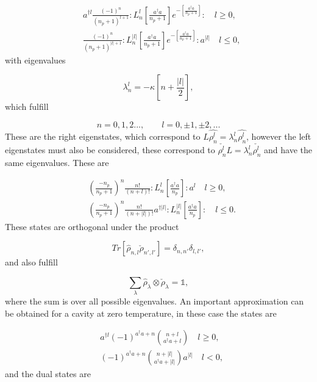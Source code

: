 \documentclass[reprint, amsmath,amssymb, aps,pra]{revtex4-1}
\begin{document}
\begin{align}\label{DefDB}
&a^{\dagger l}\frac{(-1)^n}{(n_p+1)^{l+1}}:L_n^l[\frac{a^\dagger a}{n_p+1}]e^{-[\frac{a^\dagger a}{n_p+1}]}:\quad l \geq 0, \\
&\frac{(-1)^n}{(n_p+1)^{|l|+1}}:L_n^{|l|}[\frac{a^\dagger a}{n_p+1}]e^{-[\frac{a^\dagger a}{n_p+1}]}:a^{|l|}\quad l \leq 0,
\end{align} with eigenvalues

\begin{equation}
\lambda_n^l = -\kappa[n + \frac{|l|}{2}],
\end{equation} which fulfill

\begin{equation}
n=0,1,2...,\qquad l = 0,\pm 1, \pm 2,... 
\end{equation} These are the right eigenstates, which correspond to $L\hat{\rho_n^l} = \lambda_n^l\hat{\rho_n^l}$, however the left eigenstates must also be considered, these correspond to $\check{\rho_n^l}L = \lambda_n^l\check{\rho_n^l}$ and have the same eigenvalues. These are

\begin{align}\label{DefDBDual}
&(\frac{-n_p}{n_p+1})^n\frac{n!}{(n+l)!}:L_n^l[\frac{a^\dagger a}{n_p}]:a^{l}\quad l \geq 0, \\
&(\frac{-n_p}{n_p+1})^n\frac{n!}{(n+|l|)!}a^{\dagger|l|}:L_n^{|l|}[\frac{a^\dagger a}{n_p}]:\quad l \leq 0.
\end{align} These states are orthogonal under the product

\begin{equation}
Tr[\hat{\rho}_{n,l}\check{\rho}_{n',l'}] = \delta_{n,n'}\delta_{l,l'},
\end{equation} and also fulfill

\begin{equation}\label{DampingBasisCompleteness}
\sum_{\lambda} \hat{\rho}_\lambda \otimes \check{\rho}_\lambda = \mathbb{1},
\end{equation} where the sum is over all possible eigenvalues. An important approximation can be obtained for a cavity at zero temperature, in these case the states are \cite{EnglertDB}

\begin{align}\label{DefDBZero}
&a^{\dagger l}(-1)^{a^\dagger a + n}\binom{n+l}{a^\dagger a+l} \quad l \geq 0, \\
&(-1)^{a^\dagger a + n}\binom{n+|l|}{a^\dagger a+|l|}a^{|l|} \quad l < 0,
\end{align} and the dual states are
\end{document}
